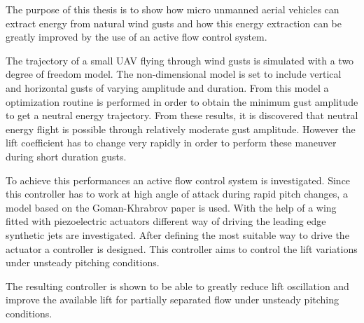\par The purpose of this thesis is to show how micro unmanned aerial vehicles can extract energy
from natural wind gusts and how this energy extraction can be greatly improved by the use of
an active flow control system.

\par The trajectory of a small UAV flying through wind gusts is simulated with a two degree of freedom model.
The non-dimensional model is set to include vertical and horizontal gusts of varying amplitude and duration.
From this model a optimization routine is performed in order to obtain the minimum gust amplitude to get a neutral energy trajectory.
From these results, it is discovered that neutral energy flight is possible through relatively moderate gust amplitude.
However the lift coefficient has to change very rapidly in order to perform these maneuver during short duration gusts. 

\par To achieve this performances an active flow control system is investigated.
Since this controller has to work at high angle of attack during rapid pitch changes, a model based on the Goman-Khrabrov paper \cite{GK} is used.
With the help of a wing fitted with piezoelectric actuators different way of driving the leading edge synthetic jets are investigated.
After defining the most suitable way to drive the actuator a controller is designed. 
This controller aims to control the lift variations under unsteady pitching conditions.

\par The resulting controller is shown to be able to greatly reduce lift oscillation and improve the available lift for partially separated flow under unsteady pitching conditions.
